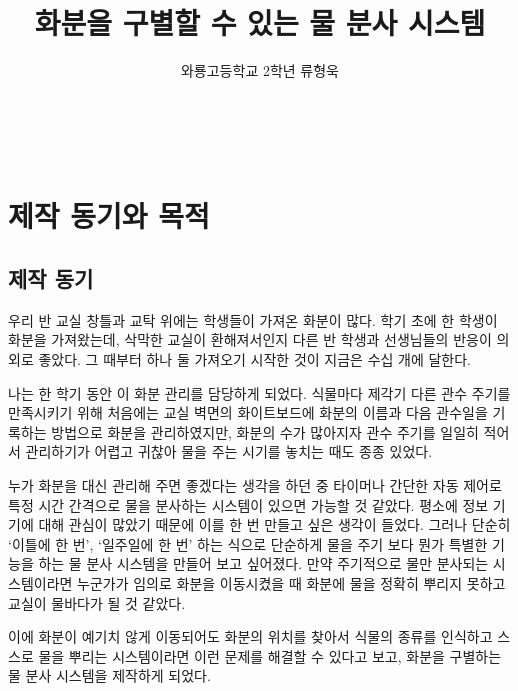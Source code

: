\documentclass[chapter,11pt,oneside,openany]{xoblivoir}
\title{화분을 구별할 수 있는 물 분사 시스템}
\author{와룡고등학교 2학년 류형욱}
\begin{document}
\pagestyle{plain}

\frontmatter
{}


\newpage


\tableofcontents
\listoffigures
\listoftables

\mainmatter

\chapter{제작 동기와 목적}

\section{제작 동기}

우리 반 교실 창틀과 교탁 위에는 학생들이 가져온 화분이 많다.
학기 초에 한 학생이 화분을 가져왔는데, 삭막한 교실이 환해져서인지
다른 반 학생과 선생님들의 반응이 의외로 좋았다.
그 때부터 하나 둘 가져오기 시작한 것이 지금은 수십 개에 달한다.

나는 한 학기 동안 이 화분 관리를 담당하게 되었다.
식물마다 제각기 다른 관수 주기를 만족시키기 위해
처음에는 교실 벽면의 화이트보드에 화분의 이름과 다음 관수일을 기록하는 방법으로
화분을 관리하였지만, 화분의 수가 많아지자 관수 주기를 일일히 적어서
관리하기가 어렵고 귀찮아 물을 주는 시기를 놓치는 때도 종종 있었다.

누가 화분을 대신 관리해 주면 좋겠다는 생각을 하던 중
타이머나 간단한 자동 제어로 특정 시간 간격으로
물을 분사하는 시스템이 있으면 가능할 것 같았다.
평소에 정보 기기에 대해 관심이 많았기 때문에 이를 한 번 만들고 싶은 생각이
들었다. 그러나 단순히 `이틀에 한 번', `일주일에 한 번' 하는 식으로 단순하게
물을 주기 보다 뭔가 특별한 기능을 하는 물 분사 시스템을 만들어 보고 싶어졌다.
만약 주기적으로 물만 분사되는 시스템이라면
누군가가 임의로 화분을 이동시켰을 때 화분에 물을 정확히 뿌리지 못하고
교실이 물바다가 될 것 같았다.

이에 화분이 예기치 않게 이동되어도 화분의 위치를 찾아서 식물의 종류를 인식하고
스스로 물을 뿌리는 시스템이라면 이런 문제를 해결할 수 있다고 보고,
화분을 구별하는 물 분사 시스템을 제작하게 되었다.
\end{document}
